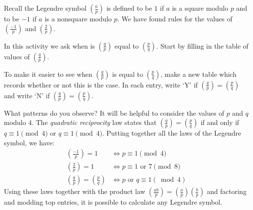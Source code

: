 \documentclass[12pt]{exam}
\begin{document}
\begin{questions}
  \question Recall the Legendre symbol $(\frac ap)$ is defined to be $1$ if $a$ is a square modulo $p$ and to be $-1$ if $a$ is a nonsquare modulo $p$. We have found rules for the values of $(\frac{-1}{p})$ and $(\frac{2}{p})$.
  
  In this activity we ask when is $(\frac qp)$ equal to $(\frac pq)$. Start by filling in the table of values of $(\frac qp)$.
  \begin{center}
  \end{center}
  \newpage
  \question To make it easier to see when $(\frac qp)$ is equal to $(\frac pq)$, make a new table which records whether or not this is the case. In each entry, write `Y' if $(\frac qp)=(\frac pq)$ and write `N' if $(\frac qp)=(\frac pq)$.
  \begin{center}
  \end{center}
  What patterns do you observe? It will be helpful to consider the values of $p$ and $q$ modulo $4$.
  \newpage
  \question The \emph{quadratic reciprocity} law states that $(\frac qp)=(\frac pq)$ if and only if $q\equiv1\pmod{4}$ or $q\equiv1\pmod{4}$. Putting together all the laws of the Legendre symbol, we have:
  \begin{align*}
    \left(\frac{-1}p\right)=1\quad&\iff p\equiv1\pmod{4}\\
    \left(\frac2p\right)=1\quad&\iff p\equiv1\text{ or }7\pmod{8}\\
    \left(\frac qp\right)=\left(\frac pq\right)&\iff p\text{ or }q\equiv1(\bmod4)
  \end{align*}
  Using these laws together with the product law $(\frac{ab}{p})=(\frac ap)(\frac bp)$ and factoring and modding top entries, it is possible to calculate any Legendre symbol.
  

\end{questions}
\end{document}
